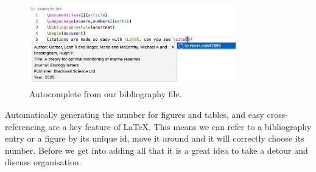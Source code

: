 \begin{figure}[h]
  \centering
  \includegraphics[width=0.8\textwidth]{figures/intellisense.png}
  \caption{Autocomplete from our bibliography file.}
  \label{fig:intellisense}
\end{figure}

Automatically generating the number for figures and tables, and easy cross-referencing are a key feature of \LaTeX.
This means we can refer to a bibliography entry or a figure by its unique id, move it around and it will correctly choose its number.
Before we get into adding all that it is a great idea to take a detour and discuss organisation.